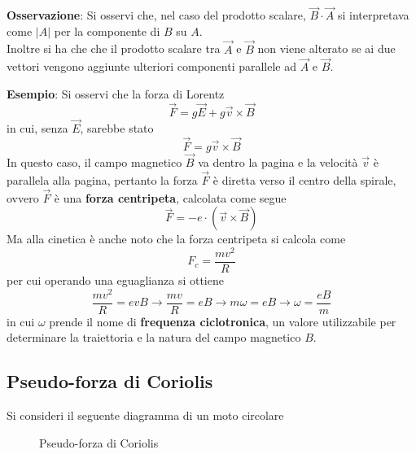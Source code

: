 \documentclass[a4paper]{extarticle}
\begin{document}
\vspace{1em}
\noindent
\textbf{Osservazione}: Si osservi che, nel caso del prodotto scalare, $\vec{B} \cdot \vec{A}$ si interpretava come $\vert A \vert$ per la componente di $B$ su $A$.\\
Inoltre si ha che che il prodotto scalare tra $\vec{A}$ e $\vec{B}$ non viene alterato se ai due vettori vengono aggiunte ulteriori componenti parallele ad $\vec{A}$ e $\vec{B}$.

\vspace{1em}
\noindent
\textbf{Esempio}: Si osservi che la forza di Lorentz
\[\vec{F} = g \vec{E} + g \vec{v} \times \vec{B}\]
in cui, senza $\vec{E}$, sarebbe stato
\[\vec{F} = g \vec{v} \times \vec{B}\]
In questo caso, il campo magnetico $\vec{B}$ va dentro la pagina e la velocità $\vec{v}$ è parallela alla pagina, pertanto la forza $\vec{F}$ è diretta verso il centro della spirale, ovvero $\vec{F}$ è una \textbf{forza centripeta}, calcolata come segue
\[\vec{F} = -e \cdot (\vec{v} \times \vec{B})\]
Ma alla cinetica è anche noto che la forza centripeta si calcola come
\[F_c = \frac{m v^2}{R}\]
per cui operando una eguaglianza si ottiene
\[\frac{m v^2}{R} = e v B \longrightarrow \frac{m v}{R} = e B \longrightarrow m \omega = e B \longrightarrow \omega = \frac{eB}{m}\]
in cui $\omega$ prende il nome di \textbf{frequenza ciclotronica}, un valore utilizzabile per determinare la traiettoria e la natura del campo magnetico $B$.

\vspace{1em}
\subsection{Pseudo-forza di Coriolis}
Si consideri il seguente diagramma di un moto circolare

\begin{figure}[H]
  \centering
  \caption{Pseudo-forza di Coriolis}
  \label{fig:pseudo_forza_coriolis}
\end{figure}
\end{document}
